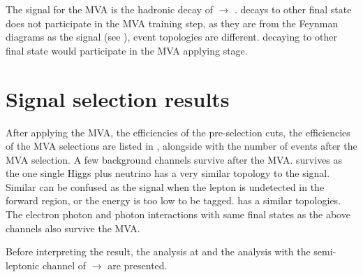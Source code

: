 The signal for the MVA is the hadronic decay of \eeToHH $\to$ \HepProcess{ \Pbottom \APbottom \PWplus \PWminus \Pnu \APnu}. \eeToHH decays to other final state does not participate in the MVA training step, as they are from the Feynman diagrams as the signal (see ), event topologies are different.  \eeToHH decaying to other final state would participate in the MVA applying stage.

\section{Signal selection results}

After applying the MVA, the efficiencies of the pre-selection cuts, the efficiencies of the MVA selections are listed in , alongside with the number of events after the MVA selection. A few  background channels survive after the MVA. \eeTo{\Pquark \APquark \PHiggs \Pnu \APnu}   survives as the one single Higgs plus neutrino has a very similar topology  to the signal. Similar \eeTo{ \Pquark \Pquark \Pquark \Pquark \Plepton \Pnu} can be confused as the signal when the lepton is undetected in the forward region, or the energy is too low to be tagged. \eeTo{ \Pquark \Pquark \Pquark \Pquark \Pnu \APnu} has a similar topologies. The electron photon and photon interactions with same final states as the above channels also survive the MVA.

Before interpreting the result, the analysis at  and  the analysis with the semi-leptonic channel of \eeToHH $\to$ \HepProcess{ \Pbottom \APbottom \PWplus \PWminus \Pnu \APnu} are presented.

